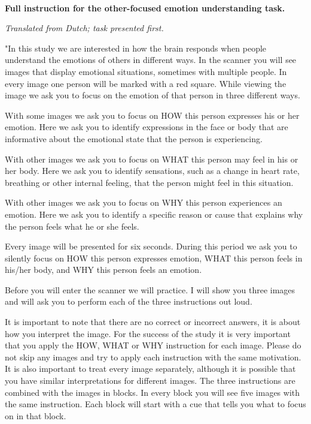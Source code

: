 \documentclass[12pt,american,a4paper,oneside,]{memoir} %
\begin{document}
~
~

\textbf{Full instruction for the other-focused emotion understanding task.}

\emph{Translated from Dutch; task presented first.}

"In this study we are interested in how the brain responds when people understand the emotions of others in different ways. In the scanner you will see images that display emotional situations, sometimes with multiple people. In every image one person will be marked with a red square. While viewing the image we ask you to focus on the emotion of that person in three different ways.

With some images we ask you to focus on HOW this person expresses his or her emotion. Here we ask you to identify expressions in the face or body that are informative about the emotional state that the person is experiencing.

With other images we ask you to focus on WHAT this person may feel in his or her body. Here we ask you to identify sensations, such as a change in heart rate, breathing or other internal feeling, that the person might feel in this situation.

With other images we ask you to focus on WHY this person experiences an emotion. Here we ask you to identify a specific reason or cause that explains why the person feels what he or she feels.

Every image will be presented for six seconds. During this period we ask you to silently focus on HOW this person expresses emotion, WHAT this person feels in his/her body, and WHY this person feels an emotion.

Before you will enter the scanner we will practice. I will show you three images and will ask you to perform each of the three instructions out loud.

It is important to note that there are no correct or incorrect answers, it is about how you interpret the image. For the success of the study it is very important that you apply the HOW, WHAT or WHY instruction for each image. Please do not skip any images and try to apply each instruction with the same motivation. It is also important to treat every image separately, although it is possible that you have similar interpretations for different images.
The three instructions are combined with the images in blocks. In every block you will see five images with the same instruction. Each block will start with a cue that tells you what to focus on in that block.
\end{document}
